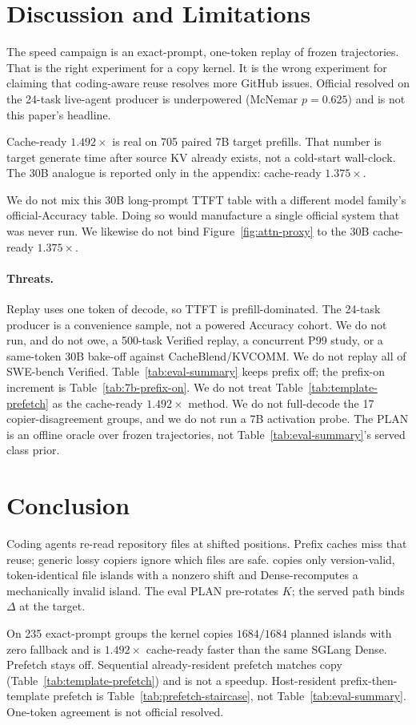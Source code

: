\section{Discussion and Limitations}
\label{sec:discussion}

The speed campaign is an exact-prompt, one-token replay of frozen
trajectories. That is the right experiment for a copy kernel. It is the
wrong experiment for claiming that coding-aware reuse resolves more
GitHub issues. Official resolved on the 24-task live-agent producer is
underpowered (McNemar $p = 0.625$) and is not this paper's headline.

Cache-ready $1.492\times$ is real on 705 paired 7B target prefills. That
number is target generate time after source KV already exists, not a
cold-start wall-clock. The 30B analogue is reported only in the
appendix: cache-ready $1.375\times$.

We do not mix this 30B long-prompt TTFT table with a different model
family's official-Accuracy table. Doing so would manufacture a single
official system that was never run. We likewise do not bind
Figure~\ref{fig:attn-proxy} to the 30B cache-ready $1.375\times$.

\paragraph{Threats.}
Replay uses one token of decode, so TTFT is prefill-dominated. The
24-task producer is a convenience sample, not a powered Accuracy
cohort. We do not run, and do not owe, a 500-task Verified replay, a
concurrent P99 study, or a same-token 30B bake-off against
CacheBlend/KVCOMM. We do not replay all of SWE-bench Verified.
Table~\ref{tab:eval-summary} keeps prefix off; the prefix-on increment
is Table~\ref{tab:7b-prefix-on}. We do not treat
Table~\ref{tab:template-prefetch} as the cache-ready $1.492\times$
method. We do not full-decode the 17 copier-disagreement groups, and we
do not run a 7B activation probe. The PLAN is an offline oracle over frozen trajectories, not
Table~\ref{tab:eval-summary}'s served class prior.

\section{Conclusion}
\label{sec:conclusion}

Coding agents re-read repository files at shifted positions. Prefix
caches miss that reuse; generic lossy copiers ignore which files are
safe. \method{} copies only version-valid, token-identical file islands
with a nonzero shift and Dense-recomputes a mechanically invalid island.
The eval PLAN pre-rotates $K$; the served path binds $\Delta$ at the
target.

On 235 exact-prompt groups the kernel copies $1684/1684$ planned islands
with zero fallback and is $1.492\times$ cache-ready faster than the same
SGLang Dense. Prefetch stays off. Sequential already-resident prefetch
matches copy (Table~\ref{tab:template-prefetch}) and is not a speedup.
Host-resident prefix-then-template prefetch is
Table~\ref{tab:prefetch-staircase}, not Table~\ref{tab:eval-summary}.
One-token agreement is not official resolved.
